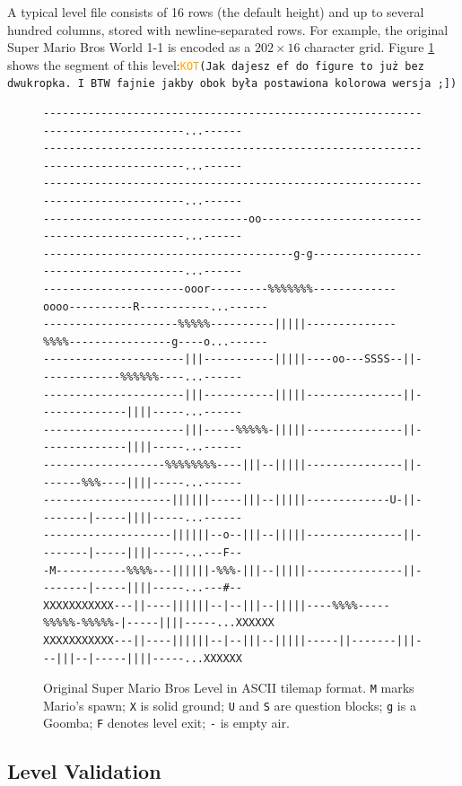 \documentclass[shortabstract, mgr, english]{iithesis}
\newcommand{\DEBUG}[1]{{#1}} %
\newcommand{\KOT}[1]{\DEBUG{\tt{\textcolor{orange}{KOT}(}{#1}{)}}}
\begin{document}
A typical level file consists of 16 rows (the default height) and up to several hundred
columns, stored with newline-separated rows. For example, the original Super Mario Bros
World 1-1 is encoded as a $202 \times 16$ character grid. Figure \ref{fig:ascii-level}
shows the segment of this level:\KOT{Jak dajesz ef do figure to już bez dwukropka. I BTW fajnie jakby obok była postawiona kolorowa wersja ;]}

\begin{figure}[H]
\centering
\begin{lstlisting}[basicstyle=\ttfamily\scriptsize,xleftmargin=0pt,xrightmargin=0pt]
---------------------------------------------------------------------------------...------
---------------------------------------------------------------------------------...------
---------------------------------------------------------------------------------...------
--------------------------------oo-----------------------------------------------...------
---------------------------------------g-g---------------------------------------...------
----------------------ooor---------%%%%%%%-------------oooo----------R-----------...------
---------------------%%%%%----------|||||--------------%%%%----------------g----o...------
----------------------|||-----------|||||----oo---SSSS--||-------------%%%%%%----...------
----------------------|||-----------|||||---------------||--------------||||-----...------
----------------------|||-----%%%%%-|||||---------------||--------------||||-----...------
-------------------%%%%%%%%----|||--|||||---------------||-------%%%----||||-----...------
--------------------||||||-----|||--|||||-------------U-||--------|-----||||-----...------
--------------------||||||--o--|||--|||||---------------||--------|-----||||-----...---F--
-M-----------%%%%---||||||-%%%-|||--|||||---------------||--------|-----||||-----...---#--
XXXXXXXXXXX---||----||||||--|--|||--|||||----%%%%-----%%%%%-%%%%%-|-----||||-----...XXXXXX
XXXXXXXXXXX---||----||||||--|--|||--|||||-----||-------|||---|||--|-----||||-----...XXXXXX
\end{lstlisting}
\caption{Original Super Mario Bros Level in ASCII tilemap format.
         \texttt{M} marks Mario's spawn; \texttt{X} is solid ground; \texttt{U} and \texttt{S}
         are question blocks; \texttt{g} is a Goomba;
         \texttt{F} denotes level exit; \texttt{-} is empty air.}
\label{fig:ascii-level}
\end{figure}

\subsection{Level Validation}
\label{subsec:sd-level-validation}
\end{document}
